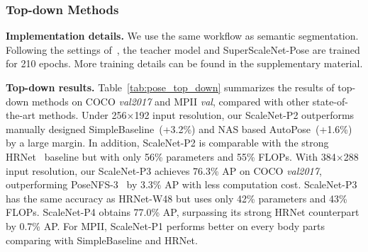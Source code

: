 \documentclass[final]{cvpr}
\newcommand{\netname}{ScaleNet\xspace}
\newcommand{\supernet}{SuperScaleNet\xspace}
\begin{document}
\subsubsection{Top-down Methods}

\noindent\textbf{Implementation details.} We use the same workflow as semantic segmentation. Following the settings of~\cite{sun2019deep, wang2020deep}, the teacher model and \supernet-Pose are trained for 210 epochs. More training details can be found in the supplementary material.

\noindent\textbf{Top-down results.} Table~\ref{tab:pose_top_down} summarizes the results of top-down methods on COCO \textit{val2017} and MPII \textit{val}, compared with other state-of-the-art methods. Under 256$\times$192 input resolution, our \netname-P2 outperforms manually designed SimpleBaseline~\cite{xiao2018simple}(+3.2\%) and NAS based AutoPose~\cite{gong2020autopose}(+1.6\%) by a large margin. In addition, \netname-P2 is comparable with the strong HRNet~\cite{wang2020deep} baseline but with only 56\% parameters and 55\% FLOPs. With 384$\times$288 input resolution, our \netname-P3 achieves 76.3\% AP on COCO \textit{val2017}, outperforming PoseNFS-3~\cite{yang2019pose} by 3.3\% AP with less computation cost. \netname-P3 has the same accuracy as HRNet-W48 but uses only 42\% parameters and 43\% FLOPs. \netname-P4 obtains 77.0\% AP, surpassing its strong HRNet counterpart by 0.7\% AP. For MPII, \netname-P1 performs better on every body parts comparing with SimpleBaseline and HRNet.
\end{document}

